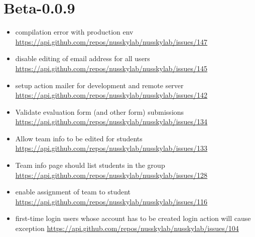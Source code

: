 {\section{Beta-0.0.9}
\begin{itemize}[noitemsep]
    \item compilation error with production env \url{https://api.github.com/repos/nusskylab/nusskylab/issues/147} 
    \item disable editing of email address for all users \url{https://api.github.com/repos/nusskylab/nusskylab/issues/145} 
    \item setup action mailer for development and remote server \url{https://api.github.com/repos/nusskylab/nusskylab/issues/142} 
    \item Validate evaluation form (and other form) submissions \url{https://api.github.com/repos/nusskylab/nusskylab/issues/134} 
    \item Allow team info to be edited for students \url{https://api.github.com/repos/nusskylab/nusskylab/issues/133} 
    \item Team info page should list students in the group \url{https://api.github.com/repos/nusskylab/nusskylab/issues/128} 
    \item enable assignment of team to student \url{https://api.github.com/repos/nusskylab/nusskylab/issues/116} 
    \item first-time login users whose account has to be created  login action will cause exception \url{https://api.github.com/repos/nusskylab/nusskylab/issues/104} 
\end{itemize}

}
